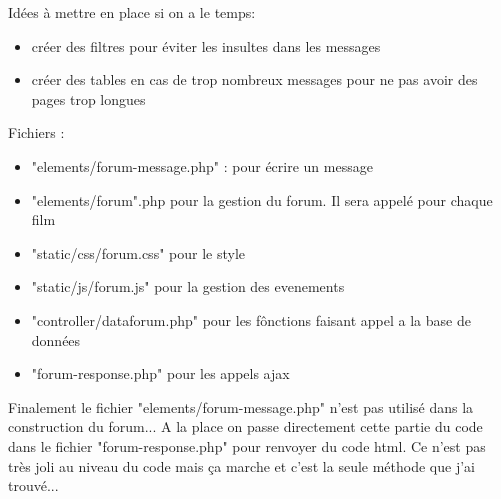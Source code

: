 \documentclass[a4paper, 11pt]{MyReport}
\begin{document}
				\bigskip
				Idées à mettre en place si on a le temps:
				\begin{itemize}
					\item créer des filtres pour éviter les insultes dans les messages
					\item créer des tables en cas de trop nombreux messages pour ne pas avoir des pages trop longues 
				\end{itemize}

				\bigskip
				Fichiers :
				\begin{itemize}
					\item "elements/forum-message.php" : pour écrire un message
					\item "elements/forum".php pour la gestion du forum. Il sera appelé pour chaque film
					\item "static/css/forum.css" pour le style
					\item "static/js/forum.js" pour la gestion des evenements
					\item "controller/dataforum.php" pour les fônctions faisant appel a la base de données
					\item "forum-response.php" pour les appels ajax
				\end{itemize}

				Finalement le fichier "elements/forum-message.php" n'est pas utilisé dans la construction du forum... A la place on passe directement cette partie du code dans le fichier "forum-response.php" pour renvoyer du code html. Ce n'est pas très joli au niveau du code mais ça marche et c'est la seule méthode que j'ai trouvé...

\end{document}
